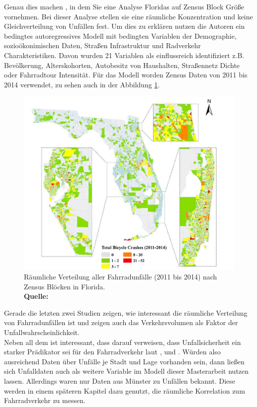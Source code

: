 \documentclass[a4paper,12pt]{thesis}
\newcommand*{\captionsource}[2]{%
	\caption[{#1}]{%
		#1%
		\\\hspace{\linewidth}%
		\textbf{Quelle:} #2%
	}%
}
\begin{document}
Genau dies machen \cite{Saha2018}, in dem Sie eine Analyse Floridas auf Zensus Block Größe vornehmen. Bei dieser Analyse stellen sie eine räumliche Konzentration und keine Gleichverteilung von Unfällen fest. Um dies zu erklären nutzen die Autoren ein bedingtes autoregressives Modell mit bedingten Variablen der Demographie, sozioökonimischen Daten, Straßen Infrastruktur und Radverkehr Charakteristiken. Davon wurden 21 Variablen als einflussreich identifiziert z.B. Bevölkerung, Alterskohorten, Autobesitz von Haushalten, Straßennetz Dichte oder Fahrradtour Intensität. Für das Modell worden Zensus Daten von 2011 bis 2014 verwendet, zu sehen auch in der Abbildung \ref{SAHA}.  
\begin{figure}[!ht]
	\centering
	\includegraphics[width=\textwidth]{Plots/saha.png}
	\captionsource{Räumliche Verteilung aller Fahrradunfälle (2011 bis 2014) nach Zensus Blöcken in Florida.}{
		\cite{Saha2018}
	}
	\label{SAHA}
\end{figure}
Gerade die letzten zwei Studien zeigen, wie interessant die räumliche Verteilung von Fahrradunfällen ist und \cite{Kondo2018} zeigen auch das Verkehrsvolumen als Faktor der Unfallwahrscheinlichkeit.\\
Neben all dem ist interessant, dass \cite{Kondo2018} darauf verweisen, dass Unfallsicherheit ein starker Prädikator sei für den Fahrradverkehr laut \cite{Pucher2010}, \cite{Thomas2013} und \cite{Winters2010}. Würden also ausreichend Daten über Unfälle je Stadt und Lage vorhanden sein, dann ließen sich Unfalldaten auch als weitere Variable im Modell dieser Masterarbeit nutzen lassen. Allerdings waren nur Daten aus Münster zu Unfällen bekannt. Diese werden in einem späteren Kapitel dazu genutzt, die räumliche Korrelation zum Fahrradverkehr zu messen.
\end{document}
